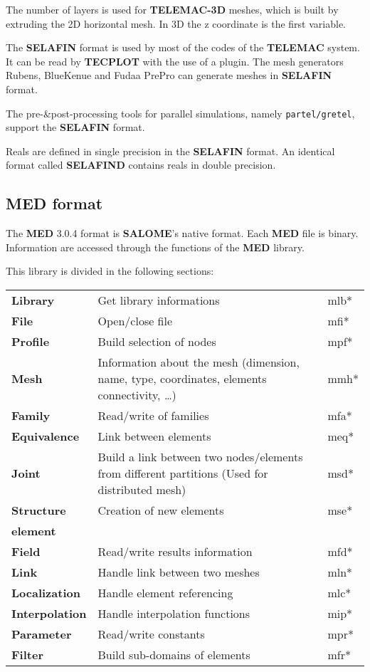 \documentclass[a4paper,10pt]{article}
\newcommand{\tel}{\textbf{TELEMAC}\xspace}
\newcommand{\teldd}{\textbf{TELEMAC-3D}\xspace}
\newcommand{\slf}{\textbf{SELAFIN}\xspace}
\newcommand{\sal}{\textbf{SALOME}\xspace}
\newcommand{\med}{\textbf{MED}\xspace}
\newcommand{\tecplot}{\textbf{TECPLOT}\xspace}
\begin{document}
The number of layers is used for \teldd meshes, which is built by extruding the
2D horizontal mesh.  In 3D the z coordinate is the first variable.

The \slf format is used by most of the codes of the \tel system. It can be read
by \tecplot with the use of a plugin.  The mesh generators Rubens, BlueKenue
and Fudaa PrePro can generate meshes in \slf format.

The pre-\&post-processing tools for parallel simulations, namely
\verb+partel/gretel+, support the \slf format.

Reals are defined in single precision in the \slf format. An identical format
called \textbf{SELAFIND} contains reals in double precision.

\subsection{\med format\cite{med}}

The \med3.0.4 format is \sal's native format. Each \med file is binary.
Information are accessed through the functions of the \med library.

This library is divided in the following sections:

\begin{tabular}{p{70pt}@{ : }p{200pt}p{50pt}}
  \textbf{Library} & Get library informations & mlb* \\
  \textbf{File} & Open/close file & mfi* \\
  \textbf{Profile} & Build selection of nodes & mpf*\\
  \textbf{Mesh} & Information about the mesh (dimension, name, type, coordinates, elements connectivity, \ldots) & mmh*\\
  \textbf{Family} & Read/write of families & mfa*\\
  \textbf{Equivalence} & Link between elements & meq*\\
  \textbf{Joint} & Build a link between two nodes/elements from different partitions (Used for distributed mesh)& msd*\\
  \textbf{Structure} & Creation of new elements & mse*\\
  \textbf{element} & & \\
  \textbf{Field} & Read/write results information & mfd*\\
  \textbf{Link} & Handle link between two meshes & mln*\\
  \textbf{Localization} & Handle element referencing & mlc*\\
  \textbf{Interpolation} & Handle interpolation functions & mip*\\
  \textbf{Parameter} & Read/write constants & mpr*\\
  \textbf{Filter} & Build sub-domains of elements & mfr*\\
\end{tabular}
\end{document}
